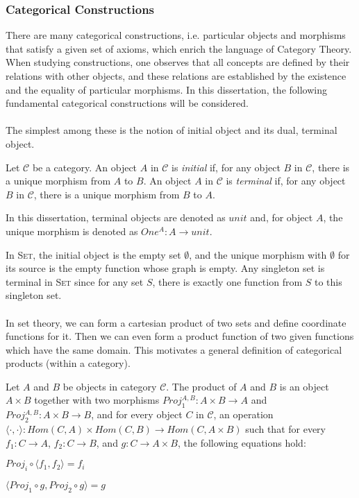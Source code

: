 \subsubsection{Categorical Constructions}
\label{sec:bg_cat_cc}
There are many categorical constructions, i.e. particular objects and morphisms that satisfy a given set of axioms, which enrich the language of Category Theory. When studying constructions, one observes that all concepts are defined by their relations with other objects, and these relations are established by the existence and the equality of particular morphisms. In this dissertation, the following fundamental categorical constructions will be considered.
\\
\\
The simplest among these is the notion of initial object and its dual, terminal object.

\begin{definition}
\label{definition:ini_ter_obj}
Let $ \mathcal{C} $ be a category. An object $ A $ in $ \mathcal{C} $ is \emph{initial} if, for any object $ B $ in $ \mathcal{C} $, there is a unique morphism from $ A $ to $ B $. An object $ A $ in $ \mathcal{C} $ is \emph{terminal} if, for any object $ B $ in $ \mathcal{C} $, there is a unique morphism from $ B $ to $ A $.
\end{definition}

In this dissertation, terminal objects are denoted as $ unit $ and, for object $ A $, the unique
morphism is denoted as $ One^A : A \to unit $.

In \textsc{Set}, the initial object is the empty set $ \emptyset $, and the unique morphism with $ \emptyset $ for its source is the empty function whose graph is empty. Any singleton set is terminal in \textsc{Set} since for any set $ S $, there is exactly one function from $ S $ to this singleton set.
\\
\\
In set theory, we can form a cartesian product of two sets and define coordinate functions for it. Then we can even form a product function of two given functions which have the same domain. This motivates a general definition of categorical products (within a category).

\begin{definition}
\label{definition:products}
Let $ A $ and $ B $ be objects in category $ \mathcal{C} $. The product of $ A $ and $ B $ is an object $ A \times B $ together with two morphisms $ Proj_1^{A,B}: A \times B \to A $ and $ Proj_2^{A,B}: A \times B \to B $, and for every object $ C $ in $ \mathcal{C} $, an operation $ \langle \cdot , \cdot \rangle : Hom(C,A) \times Hom(C,B) \to Hom(C, A \times B) $ such that for every $ f_1 : C \to A $, $ f_2 : C \to B $, and $ g : C \to A \times B $, the following equations hold:
\begin{myitemize}
\item $ Proj_i \circ \langle f_1 , f_2 \rangle = f_i $
\item $ \langle Proj_1 \circ g , Proj_2 \circ g \rangle = g $
\end{myitemize}
\end{definition}

